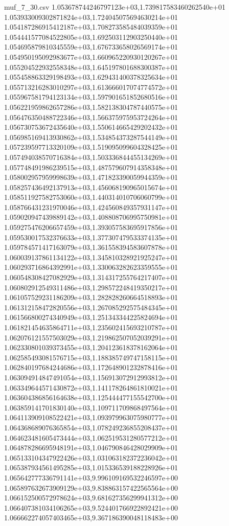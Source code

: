 \begin{filecontents*}{muf_7_30.csv}
1.053678744246797123e+03,1.739817583460262540e+01
1.053933009302871824e+03,1.724045075694630214e+01
1.054187286915412187e+03,1.708273585484039359e+01
1.054441577084522805e+03,1.692503112903250440e+01
1.054695879810345559e+03,1.676733658026569174e+01
1.054950195092983677e+03,1.660965220930120267e+01
1.055204522932558348e+03,1.645197801688300387e+01
1.055458863329198493e+03,1.629431400378325634e+01
1.055713216283010297e+03,1.613666017074774572e+01
1.055967581794123134e+03,1.597901651852680516e+01
1.056221959862657286e+03,1.582138304787440575e+01
1.056476350488722346e+03,1.566375975953724264e+01
1.056730753672435640e+03,1.550614665429202432e+01
1.056985169413930862e+03,1.534854373287544149e+01
1.057239597713320109e+03,1.519095099604328425e+01
1.057494038570716384e+03,1.503336844455134269e+01
1.057748491986239515e+03,1.487579607914358348e+01
1.058002957959998639e+03,1.471823390059944359e+01
1.058257436492137913e+03,1.456068190965015674e+01
1.058511927582753060e+03,1.440314010706060799e+01
1.058766431231970046e+03,1.424560849357931147e+01
1.059020947439889142e+03,1.408808706995750981e+01
1.059275476206657459e+03,1.393057583695917856e+01
1.059530017532376633e+03,1.377307479533374135e+01
1.059784571417163079e+03,1.361558394583607878e+01
1.060039137861134122e+03,1.345810328921925247e+01
1.060293716864392991e+03,1.330063282623359555e+01
1.060548308427082929e+03,1.314317255764217407e+01
1.060802912549311486e+03,1.298572248419350217e+01
1.061057529231186209e+03,1.282828260664518893e+01
1.061312158472820556e+03,1.267085292575484345e+01
1.061566800274340949e+03,1.251343344225824694e+01
1.061821454635864711e+03,1.235602415693210787e+01
1.062076121557503029e+03,1.219862507052039291e+01
1.062330801039373455e+03,1.204123618378162064e+01
1.062585493081576715e+03,1.188385749747158115e+01
1.062840197684244686e+03,1.172648901232878416e+01
1.063094914847491054e+03,1.156913072912993812e+01
1.063349644571430872e+03,1.141178264861810021e+01
1.063604386856164638e+03,1.125444477155542700e+01
1.063859141701830140e+03,1.109711709868497564e+01
1.064113909108522421e+03,1.093979963075980777e+01
1.064368689076365854e+03,1.078249236855208437e+01
1.064623481605473444e+03,1.062519531280577212e+01
1.064878286695948191e+03,1.046790846428029909e+01
1.065133104347922426e+03,1.031063182372236042e+01
1.065387934561495285e+03,1.015336539188228926e+01
1.065642777336791141e+03,9.996109169532246597e+00
1.065897632673909129e+03,9.838863157422565564e+00
1.066152500572978624e+03,9.681627356299941312e+00
1.066407381034106265e+03,9.524401766922892421e+00
1.066662274057403465e+03,9.367186390048118483e+00

\end{filecontents*}
